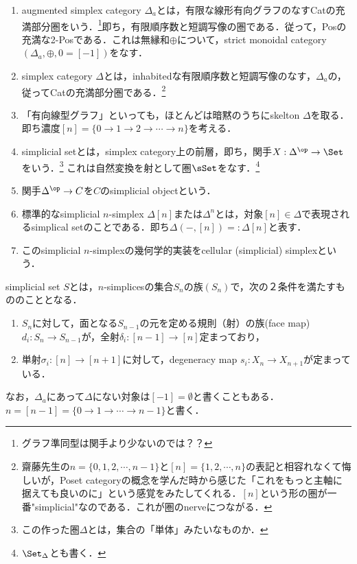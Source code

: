 \documentclass[uplatex,dvipdfmx]{jsreport}
\begin{document}
\begin{definition}\mbox{}
    \begin{enumerate}
        \item augmented simplex category $\Delta_a$とは，有限な線形有向グラフのなすCatの充満部分圏をいう．\footnote{グラフ準同型は関手より少ないのでは？？}即ち，有限順序数と短調写像の圏である．従って，Posの充満な2-Posである．これは無縁和$\oplus$について，strict monoidal category $(\Delta_a,\oplus,0=[-1])$をなす．
        \item simplex category $\Delta$とは，inhabitedな有限順序数と短調写像のなす，$\Delta_a$の，従ってCatの充満部分圏である．\footnote{齋藤先生の$n=\{0,1,2,\cdots,n-1\}$と$[n]=\{1,2,\cdots,n\}$の表記と相容れなくて悔しいが，Poset categoryの概念を学んだ時から感じた「これをもっと主軸に据えても良いのに」という感覚をみたしてくれる．$[n]$という形の圏が一番"simplicial"なのである．これが圏のnerveにつながる．}
        \item 「有向線型グラフ」といっても，ほとんどは暗黙のうちにskelton $\Delta$を取る．即ち濃度$[n]=\{0\to 1\to 2\to\cdots\to n\}$を考える．
        \item simplicial setとは，simplex category上の前層，即ち，関手$X:\Delta^\op\to\Set$をいう．\footnote{この作った圏$\Delta$とは，集合の「単体」みたいなものか．}
        これは自然変換を射として圏$\sSet$をなす．\footnote{$\Set_\Delta$とも書く．}
        \item 関手$\Delta^\op\to C$を$C$のsimplicial objectという．
        \item 標準的なsimplicial $n$-simplex $\Delta[n]$または$\Delta^n$とは，対象$[n]\in\Delta$で表現されるsimplical setのことである．即ち$\Delta(-,[n])=:\Delta[n]$と表す．
        \item このsimplicial $n$-simplexの幾何学的実装をcellular (simplicial) simplexという．
    \end{enumerate}
\end{definition}
\begin{remarks}
    simplicial set $S$とは，$n$-simplicesの集合$S_n$の族$(S_n)$で，次の２条件を満たすもののこととなる．
    \begin{enumerate}
        \item $S_n$に対して，面となる$S_{n-1}$の元を定める規則（射）の族(face map) $d_i:S_n\to S_{n-1}$が，全射$\delta_i:[n-1]\to[n]$定まっており，
        \item 単射$\sigma_i:[n]\to[n+1]$に対して，degeneracy map $s_i:X_n\to X_{n+1}$が定まっている．
    \end{enumerate}
    なお，$\Delta_a$にあって$\Delta$にない対象は$[-1]=\emptyset$と書くこともある．
    $n=[n-1]=\{0\to 1\to\cdots\to n-1\}$と書く．
\end{remarks}
\end{document}
